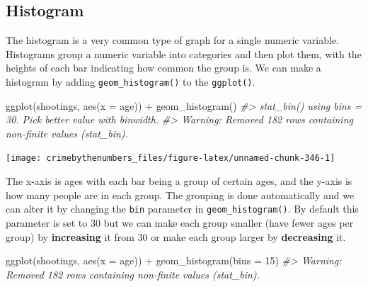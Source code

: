 \documentclass[
]{krantz}
\makeatletter
\newenvironment{Shaded}{\begin{snugshade}}{\end{snugshade}}
\newcommand{\AttributeTok}[1]{\textcolor[rgb]{0.61,0.61,0.61}{#1}}
\newcommand{\CommentTok}[1]{\textcolor[rgb]{0.37,0.37,0.37}{\textit{#1}}}
\newcommand{\DecValTok}[1]{\textcolor[rgb]{0.06,0.06,0.06}{#1}}
\newcommand{\FunctionTok}[1]{\textcolor[rgb]{0,0,0}{#1}}
\newcommand{\NormalTok}[1]{#1}
\newcommand{\SpecialCharTok}[1]{\textcolor[rgb]{0,0,0}{#1}}
\newenvironment{kframe}{%
\medskip{}
\setlength{\fboxsep}{.8em}
 \def\at@end@of@kframe{}%
 \ifinner\ifhmode%
  \def\at@end@of@kframe{\end{minipage}}%
  \begin{minipage}{\columnwidth}%
 \fi\fi%
 \def\FrameCommand##1{\hskip\@totalleftmargin \hskip-\fboxsep
 \colorbox{shadecolor}{##1}\hskip-\fboxsep
     \hskip-\linewidth \hskip-\@totalleftmargin \hskip\columnwidth}%
 \MakeFramed {\advance\hsize-\width
   \@totalleftmargin\z@ \linewidth\hsize
   \@setminipage}}%
 {\par\unskip\endMakeFramed%
 \at@end@of@kframe}
\renewenvironment{Shaded}{\begin{kframe}}{\end{kframe}}
\makeatother
\begin{document}
\hypertarget{histogram}{%
\subsection{Histogram}\label{histogram}}

The histogram is a very common type of graph for a single numeric variable. Histograms group a numeric variable into categories and then plot them, with the heights of each bar indicating how common the group is. We can make a histogram by adding \texttt{geom\_histogram()} to the \texttt{ggplot()}.

\begin{Shaded}
\begin{Highlighting}[]
\FunctionTok{ggplot}\NormalTok{(shootings, }\FunctionTok{aes}\NormalTok{(}\AttributeTok{x =}\NormalTok{ age)) }\SpecialCharTok{+} 
  \FunctionTok{geom\_histogram}\NormalTok{()}
\CommentTok{\#\textgreater{} \textasciigrave{}stat\_bin()\textasciigrave{} using \textasciigrave{}bins = 30\textasciigrave{}. Pick better value with \textasciigrave{}binwidth\textasciigrave{}.}
\CommentTok{\#\textgreater{} Warning: Removed 182 rows containing non{-}finite values (stat\_bin).}
\end{Highlighting}
\end{Shaded}

\begin{center}\texttt{[image: crimebythenumbers\_files/figure-latex/unnamed-chunk-346-1]} \end{center}

The x-axis is ages with each bar being a group of certain ages, and the y-axis is how many people are in each group. The grouping is done automatically and we can alter it by changing the \texttt{bin} parameter in \texttt{geom\_histogram()}. By default this parameter is set to 30 but we can make each group smaller (have fewer ages per group) by \textbf{increasing} it from 30 or make each group larger by \textbf{decreasing} it.

\begin{Shaded}
\begin{Highlighting}[]
\FunctionTok{ggplot}\NormalTok{(shootings, }\FunctionTok{aes}\NormalTok{(}\AttributeTok{x =}\NormalTok{ age)) }\SpecialCharTok{+} 
  \FunctionTok{geom\_histogram}\NormalTok{(}\AttributeTok{bins =} \DecValTok{15}\NormalTok{)}
\CommentTok{\#\textgreater{} Warning: Removed 182 rows containing non{-}finite values (stat\_bin).}
\end{Highlighting}
\end{Shaded}
\end{document}
